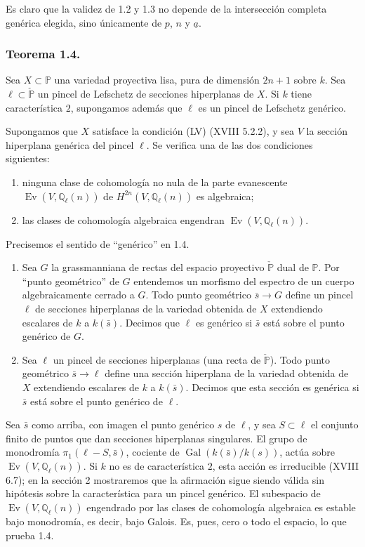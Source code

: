Es claro que la validez de 1.2 y 1.3 no depende de la intersección
completa genérica elegida, sino únicamente de $p$, $n$ y
$\underline a$.

\pageoriginale

\subsubsection*{Teorema 1.4.}

Sea $X\subset\mathbb P$ una variedad proyectiva lisa, pura de dimensión
$2n+1$ sobre $k$. Sea $\ell\subset\check{\mathbb P}$ un pincel de
Lefschetz de secciones hiperplanas de $X$. Si $k$ tiene característica
$2$, supongamos además que $\ell$ es un pincel de Lefschetz genérico.

Supongamos que $X$ satisface la condición (LV) (XVIII 5.2.2), y sea $V$
la sección hiperplana genérica del pincel $\ell$. Se verifica una de las
dos condiciones siguientes:
\begin{enumerate}[label=(\alph*)]
\item ninguna clase de cohomología no nula de la parte evanescente
  $\operatorname{Ev}(V,\mathbb Q_\ell(n))$ de
  $H^{2n}(V,\mathbb Q_\ell(n))$ es algebraica;
\item las clases de cohomología algebraica engendran
  $\operatorname{Ev}(V,\mathbb Q_\ell(n))$.
\end{enumerate}

Precisemos el sentido de ``genérico'' en 1.4.
\begin{enumerate}[label=(\alph*)]
\item Sea $G$ la grassmanniana de rectas del espacio proyectivo
  $\check{\mathbb P}$ dual de $\mathbb P$. Por ``punto geométrico'' de
  $G$ entendemos un morfismo del espectro de un cuerpo algebraicamente
  cerrado a $G$. Todo punto geométrico $\bar s\to G$ define un pincel
  $\ell$ de secciones hiperplanas de la variedad obtenida de $X$
  extendiendo escalares de $k$ a $k(\bar s)$. Decimos que $\ell$ es
  genérico si $\bar s$ está sobre el punto genérico de $G$.
\item Sea $\ell$ un pincel de secciones hiperplanas (una recta de
  $\check{\mathbb P}$). Todo punto geométrico $\bar s\to\ell$ define
  una sección hiperplana de la variedad obtenida de $X$ extendiendo
  escalares de $k$ a $k(\bar s)$. Decimos que esta sección es genérica
  si $\bar s$ está sobre el punto genérico de $\ell$.
\end{enumerate}

Sea $\bar s$ como arriba, con imagen el punto genérico $s$ de $\ell$, y
sea $S\subset\ell$ el conjunto finito de puntos que dan secciones
hiperplanas singulares. El grupo de monodromía
$\pi_1(\ell-S,\bar s)$, cociente de
$\operatorname{Gal}(k(\bar s)/k(s))$, actúa sobre
$\operatorname{Ev}(V,\mathbb Q_\ell(n))$. Si $k$ no es de
característica $2$, esta acción es irreducible (XVIII 6.7); en la
sección 2 mostraremos que la afirmación sigue siendo válida sin
hipótesis sobre la característica para un pincel genérico. El
subespacio de $\operatorname{Ev}(V,\mathbb Q_\ell(n))$ engendrado por
las clases de cohomología algebraica es estable bajo monodromía, es
decir, bajo Galois. Es, pues, cero o todo el espacio, lo que prueba 1.4.


